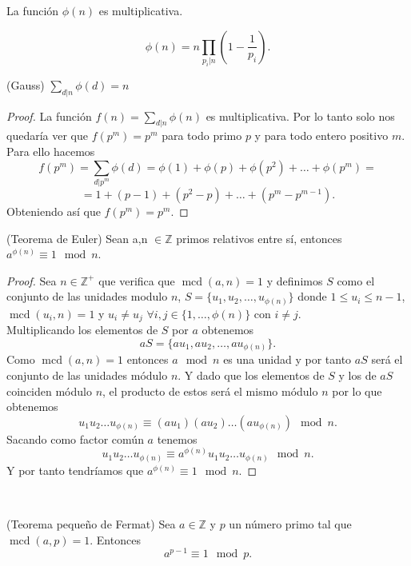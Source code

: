 \begin{corolario}
	La función $\phi(n)$ es multiplicativa.
\end{corolario}

\begin{corolario}
	 $$\phi(n)=n\prod_{p_i|n}\left(1-\frac{1}{p_i}\right).$$ 
\end{corolario}

\begin{lema}
		(Gauss) $\sum_{d|n}\phi(d)=n$
\end{lema}
\begin{proof}
		La función $f(n)=\sum_{d|n}\phi(n)$   es multiplicativa. Por lo tanto solo nos quedaría ver que $f(p^m)=p^m$ para todo primo $p$ y para todo entero positivo $m$.\\ Para ello hacemos
		$$
			f(p^m)=\sum_{d|p^m}\phi(d)=\phi(1)+\phi(p)+\phi(p^2)+\dots+\phi(p^m)= 
		$$\vspace*{-7mm}
		$$
			= 1+(p-1)+(p^2-p)+\dots+(p^m-p^{m-1}).
		$$
		Obteniendo así que $f(p^m)=p^m$.
\end{proof}
\begin{teorema}
	(Teorema de Euler) Sean a,n $\in \mathbb{Z}$ primos relativos entre sí, entonces $a^{\phi(n)}\equiv 1 \mod n$.
\end{teorema}
\begin{proof}
		Sea $n\in \mathbb{Z^+}$ que verifica que $\operatorname{mcd}(a,n)=1$ y definimos $S$ como el conjunto de las unidades modulo $n$, $S=\{u_1,u_2,\dots,u_{\phi(n)}\}$ donde $1\leq u_i\leq n-1$, $\operatorname{mcd}(u_i,n)=1$ y $u_i\neq u_j$ $\forall i,j \in \{1,\dots,\phi(n)\}$ con $ i\neq j$.\\
	Multiplicando  los elementos de $S$ por $a$ obtenemos 
	$$
		aS=\{au_1,au_2,\dots,au_{\phi(n)}\}.
	$$
	Como $\operatorname{mcd}(a,n)=1$ entonces $a\mod n$ es una unidad y por tanto $aS$ será el conjunto de las unidades módulo $n$. Y dado que los elementos de $S$ y los de $aS$ coinciden módulo $n$, el producto de estos será el mismo módulo $n$ por lo que obtenemos 
	$$
		u_1u_2\dots u_{\phi(n)} \equiv (au_1)(au_2)\dots (au_{\phi(n)})\mod n.
	$$
	Sacando como factor común $a$ tenemos 
	$$
		u_1u_2\dots u_{\phi(n)} \equiv a^{\phi(n)}u_1u_2\dots u_{\phi(n)}\mod n. 
	$$
	Y por tanto tendríamos que $a^{\phi(n)}\equiv 1 \mod n$.
\end{proof}\\

\begin{teorema}
		(Teorema pequeño de Fermat) Sea $a \in \mathbb{Z}$ y $p$ un número primo tal que $\operatorname{mcd}(a,p)=1$. Entonces
	$$
		a^{p-1} \equiv 1 \mod p.
	$$
\end{teorema}

